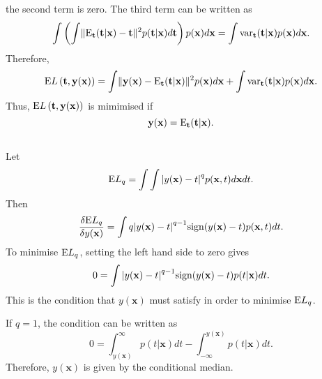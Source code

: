 %
the second term is zero.
The third term can be written as
%
\begin{equation}
\int \left( \int \lVert {\rm E}_\mathbf{t} (\mathbf{t} | \mathbf{x}) - \mathbf{t} \rVert ^ 2 p(\mathbf{t} | \mathbf{x}) d\mathbf{t} \right) p(\mathbf{x}) d\mathbf{x} = \int {\rm var}_{\mathbf{t}} (\mathbf{t} | \mathbf{x}) p(\mathbf{x}) d\mathbf{x}.
\end{equation}
%
Therefore,
%
\begin{equation}
{\rm E} L\left( \mathbf{t}, \mathbf{y} (\mathbf{x}) \right) = \int \lVert \mathbf{y}(\mathbf{x}) - {\rm E}_\mathbf{t} (\mathbf{t} | \mathbf{x}) \rVert ^ 2 p(\mathbf{x}) d\mathbf{x} + \int {\rm var}_{\mathbf{t}} (\mathbf{t} | \mathbf{x}) p(\mathbf{x}) d\mathbf{x}.
\end{equation}
%
Thus, ${\rm E} L\left( \mathbf{t}, \mathbf{y} (\mathbf{x}) \right)$ is mimimised if
%
\begin{equation}
\mathbf{y} (\mathbf{x}) = {\rm E}_\mathbf{t} (\mathbf{t} | \mathbf{x}).
\end{equation}


\subsection{}
\label{1.27}
Let
%
\begin{equation}
{\rm E} L_q = \int \int \abs{y(\mathbf{x}) - t} ^ q p(\mathbf{x}, t) d\mathbf{x} dt.
\end{equation}
%
Then
%
\begin{equation}
\frac{\delta {\rm E} L_q}{\delta y (\mathbf{x})} = \int q \abs{y(\mathbf{x}) - t} ^ {q - 1} {\rm sign} (y(\mathbf{x}) - t) p(\mathbf{x}, t) dt.
\end{equation}
%
To minimise ${\rm E} L_q$, setting the left hand side to zero gives
%
\begin{equation}
0 = \int \abs{y(\mathbf{x}) - t} ^ {q - 1} {\rm sign} (y(\mathbf{x}) - t) p(t | \mathbf{x}) dt.
\end{equation}
%
This is the condition that $y(\mathbf{x})$ must satisfy in order to minimise ${\rm E} L_q$.

If $q = 1$, the condition can be written as
%
\begin{equation}
0 = \int_{y(\mathbf{x})}^{\infty} p(t | \mathbf{x}) dt - \int_{- \infty}^{y(\mathbf{x})} p(t | \mathbf{x}) dt.
\end{equation}
%
Therefore, $y(\mathbf{x})$ is given by the conditional median.



